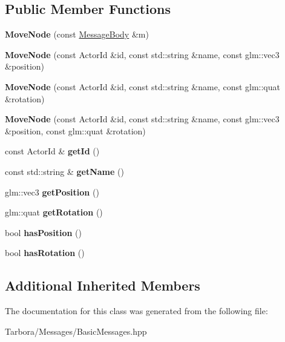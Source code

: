 \subsection*{Public Member Functions}
\begin{DoxyCompactItemize}
\item 
\mbox{\label{classTarbora_1_1Message_1_1MoveNode_a840ff52dfb031e3dc72b5a946c02de46}} 
{\bfseries Move\+Node} (const \hyperlink{classTarbora_1_1MessageBody}{Message\+Body} \&m)
\item 
\mbox{\label{classTarbora_1_1Message_1_1MoveNode_aa89ec1e3142329f46b81b6f0259193be}} 
{\bfseries Move\+Node} (const Actor\+Id \&id, const std\+::string \&name, const glm\+::vec3 \&position)
\item 
\mbox{\label{classTarbora_1_1Message_1_1MoveNode_a7a46dd9b7280c1623e13cb98e6a2720e}} 
{\bfseries Move\+Node} (const Actor\+Id \&id, const std\+::string \&name, const glm\+::quat \&rotation)
\item 
\mbox{\label{classTarbora_1_1Message_1_1MoveNode_a8076b46ff39a2193e5ad6d6c3a63d742}} 
{\bfseries Move\+Node} (const Actor\+Id \&id, const std\+::string \&name, const glm\+::vec3 \&position, const glm\+::quat \&rotation)
\item 
\mbox{\label{classTarbora_1_1Message_1_1MoveNode_afa0b1e4ea6610b7d888c54d322936f5c}} 
const Actor\+Id \& {\bfseries get\+Id} ()
\item 
\mbox{\label{classTarbora_1_1Message_1_1MoveNode_ab43c4a8f46d66e216f6d52777902a6a2}} 
const std\+::string \& {\bfseries get\+Name} ()
\item 
\mbox{\label{classTarbora_1_1Message_1_1MoveNode_ab2378e0083404a81db224e7f338efdb9}} 
glm\+::vec3 {\bfseries get\+Position} ()
\item 
\mbox{\label{classTarbora_1_1Message_1_1MoveNode_a0333ae263ec1f2ee6fda1e04a682d1b6}} 
glm\+::quat {\bfseries get\+Rotation} ()
\item 
\mbox{\label{classTarbora_1_1Message_1_1MoveNode_a7e6bd50bec6c1e166652c65a00dc9fdf}} 
bool {\bfseries has\+Position} ()
\item 
\mbox{\label{classTarbora_1_1Message_1_1MoveNode_a7c7fc0cc078ab1512896434a08ff14cb}} 
bool {\bfseries has\+Rotation} ()
\end{DoxyCompactItemize}
\subsection*{Additional Inherited Members}


The documentation for this class was generated from the following file\+:\begin{DoxyCompactItemize}
\item 
Tarbora/\+Messages/Basic\+Messages.\+hpp\end{DoxyCompactItemize}
